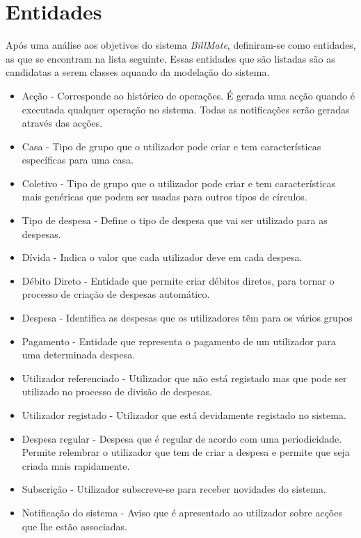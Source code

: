 \section{Entidades}

Após uma análise aos objetivos do sistema \textit{BillMate}, definiram-se como entidades, as que se encontram na lista seguinte. Essas entidades que são listadas são as candidatas a serem classes aquando da modelação do sistema.

\begin{itemize}
\item Acção - Corresponde ao histórico de operações. É gerada uma acção quando é executada qualquer operação no sistema. Todas as notificações serão geradas através das acções.
\item Casa - Tipo de grupo que o utilizador pode criar e tem características específicas para uma casa.
\item Coletivo - Tipo de grupo que o utilizador pode criar e tem características mais genéricas que podem ser usadas para outros tipos de círculos.
\item Tipo de despesa - Define o tipo de despesa que vai ser utilizado para as despesas.
\item Dívida - Indica o valor que cada utilizador deve em cada despesa.
\item Débito Direto - Entidade que permite criar débitos diretos, para tornar o processo de criação de despesas automático.
\item Despesa - Identifica as despesas que os utilizadores têm para os vários grupos
\item Pagamento - Entidade que representa o pagamento de um utilizador para uma determinada despesa.
\item Utilizador referenciado - Utilizador que não está registado mas que pode ser utilizado no processo de divisão de despesas.
\item Utilizador registado - Utilizador que está devidamente registado no sistema.
\item Despesa regular - Despesa que é regular de acordo com uma periodicidade. Permite relembrar o utilizador que tem de criar a despesa e permite que seja criada mais rapidamente.
\item Subscrição - Utilizador subscreve-se para receber novidades do sistema.
\item Notificação do sistema - Aviso que é apresentado ao utilizador sobre acções que lhe estão associadas.
\end{itemize}